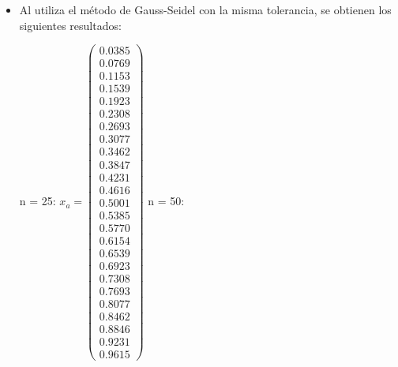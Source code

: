 \documentclass{udpreport}
\begin{document}
\begin{enumerate}
\begin{enumerate}
{{{{\begin{itemize}
				\item Al utiliza el método de Gauss-Seidel con la misma tolerancia, se obtienen los siguientes resultados:
				
				n = 25:
				$x_{a} = \left(\begin{array}{c} 0.0385\\ 0.0769\\ 0.1153\\ 0.1539\\ 0.1923\\ 0.2308\\ 0.2693\\ 0.3077\\ 0.3462\\ 0.3847\\ 0.4231\\ 0.4616\\ 0.5001\\ 0.5385\\ 0.5770\\ 0.6154\\ 0.6539\\ 0.6923\\ 0.7308\\ 0.7693\\ 0.8077\\ 0.8462\\ 0.8846\\ 0.9231\\ 0.9615 \end{array}\right)$
				n = 50:

\end{itemize}}}}}
\end{enumerate}
\end{enumerate}
\end{document}
